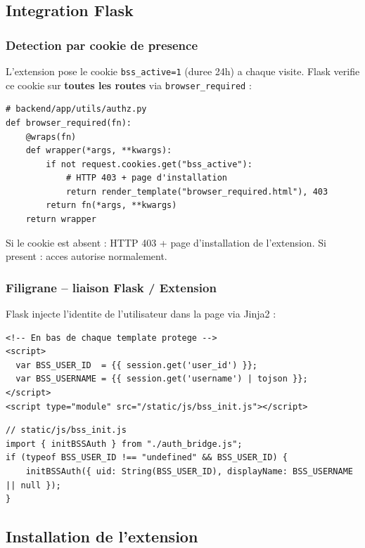 \documentclass[12pt,a4paper]{article}
\begin{document}
\subsection{Integration Flask}

\subsubsection*{Detection par cookie de presence}

L'extension pose le cookie \texttt{bss\_active=1} (duree 24h) a chaque visite.
Flask verifie ce cookie sur \textbf{toutes les routes} via \texttt{browser\_required} :

\begin{lstlisting}
# backend/app/utils/authz.py
def browser_required(fn):
    @wraps(fn)
    def wrapper(*args, **kwargs):
        if not request.cookies.get("bss_active"):
            # HTTP 403 + page d'installation
            return render_template("browser_required.html"), 403
        return fn(*args, **kwargs)
    return wrapper
\end{lstlisting}

Si le cookie est absent : HTTP 403 + page d'installation de l'extension.
Si present : acces autorise normalement.

\subsubsection*{Filigrane -- liaison Flask / Extension}

Flask injecte l'identite de l'utilisateur dans la page via Jinja2 :

\begin{lstlisting}
<!-- En bas de chaque template protege -->
<script>
  var BSS_USER_ID  = {{ session.get('user_id') }};
  var BSS_USERNAME = {{ session.get('username') | tojson }};
</script>
<script type="module" src="/static/js/bss_init.js"></script>
\end{lstlisting}

\begin{lstlisting}
// static/js/bss_init.js
import { initBSSAuth } from "./auth_bridge.js";
if (typeof BSS_USER_ID !== "undefined" && BSS_USER_ID) {
    initBSSAuth({ uid: String(BSS_USER_ID), displayName: BSS_USERNAME || null });
}
\end{lstlisting}

\subsection{Installation de l'extension}
\end{document}
